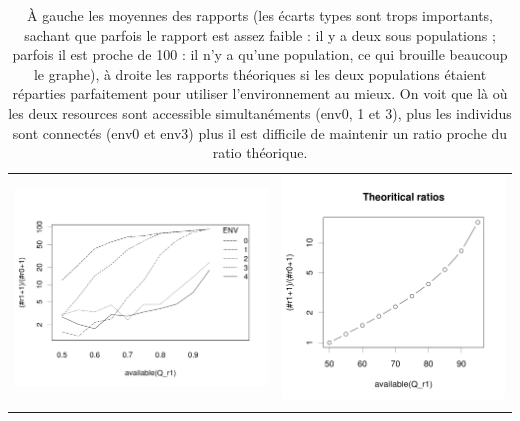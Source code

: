 \documentclass[a4paper,10pt]{article}
\begin{document}
\begin{table}[H]
\centering
\caption{À gauche les moyennes des rapports (les écarts types sont trops importants, sachant que parfois le rapport est assez faible : il y a deux sous populations ; parfois il est proche de 100 : il n'y a qu'une population, ce qui brouille beaucoup le graphe), à droite les rapports théoriques si les deux populations étaient réparties parfaitement pour utiliser l'environnement au mieux. On voit que là où les deux resources sont accessible simultanéments (env0, 1 et 3), plus les individus sont connectés (env0 et env3) plus il est difficile de maintenir un ratio proche du ratio théorique.}
\begin{tabular}{cc}
\includegraphics[height=\imgSize]{../images/5StaticEnv/ratioR1R2foreachEnv}&\includegraphics[height=\imgSize]{../images/5StaticEnv/theroticalRatios.png}\\
\newline
\end{tabular}
\end{table}
\end{document}
